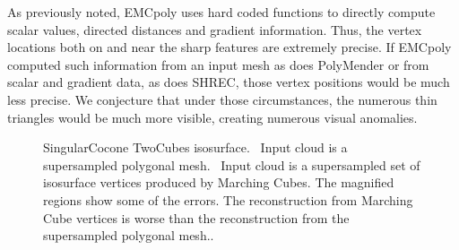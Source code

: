 As previously noted, EMCpoly uses hard coded functions
to directly compute scalar values,
directed distances and gradient information.
Thus, the vertex locations both on and near the sharp features
are extremely precise.
If EMCpoly computed such information from an input mesh as does PolyMender
or from scalar and gradient data, as does SHREC,
those vertex positions would be much less precise.
We conjecture that under those circumstances,
the numerous thin triangles would be much more visible,
creating numerous visual anomalies.


\begin{figure}[t] 
	\centering 

\caption{SingularCocone TwoCubes isosurface. 
\protect{}~Input cloud is a supersampled polygonal mesh. 
\protect{}~Input cloud is a supersampled
set of isosurface vertices produced by Marching Cubes.
The magnified regions show some of the errors. 
The reconstruction from Marching Cube vertices is worse 
than the reconstruction from the supersampled polygonal mesh.. }
	\label{fig:cocone_compare_from_perfect_1}
	\vskip-0.2cm
\end{figure} 



